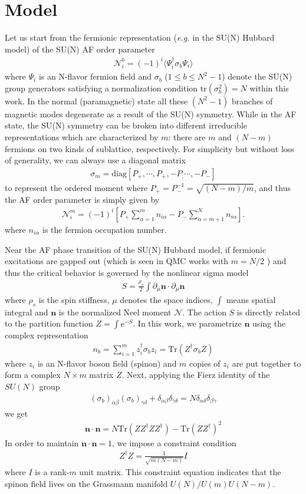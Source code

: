 \documentclass[aps,twocolumn,superscriptaddress]{revtex4-1}
\newcommand{\bea}{\begin{eqnarray}}
\newcommand{\eea}{\end{eqnarray}}
\newcommand{\bn}{\mathbf{n}}
\newcommand{\eg}{\textit{e.g.{ }}}
\newcommand{\me}{\mathrm{e}}
\begin{document}
\section{Model}
Let us start from the fermionic representation (\eg in the SU(N) Hubbard model) of the SU(N) AF order parameter \bea
\mathcal{N}_i^b=(-1)^i\langle \Psi_i^\dagger \sigma_b \Psi_i\rangle \eea where $\Psi_i$ is an N-flavor fermion field and
$\sigma_b$ ($1\le b\le N^2-1$) denote the SU(N) group generators satisfying a normalization condition
$\mathrm{tr}(\sigma_b^2)=N$ within this work. In the normal (paramagnetic) state all these $(N^2-1)$ branches of magnetic modes
degenerate as a result of the SU(N) symmetry. While in the AF state, the SU(N) symmetry can be broken into different
irreducible representations which are characterized by $m$: there are $m$ and $(N-m)$ fermions on two kinds of
sublattice, respectively. For simplicity but without loss of generality, we can always use a diagonal matrix \bea
\sigma_m=\text{diag}\left[P_+,\cdots,P_+,-P_,\cdots,-P_-\right] \eea to represent the ordered moment where
$P_+=P_-^{-1}=\sqrt{(N-m)/m}$, and thus the AF order parameter is simply given by \bea
\mathcal{N}_i^m=(-1)^i\left[P_+\sum_{\alpha=1}^m n_{i\alpha}-P_-\sum_{\alpha=m+1}^{N}n_{i\alpha} \right]. \eea where
$n_{i\alpha}$ is the fermion occupation number. 

Near the AF phase transition of the SU(N) Hubbard model, if fermionic excitations are gapped out (which is seen in QMC
works with $m=N/2$ \cite{cai2013,wang2014}) and thus the critical behavior is governed by the nonlinear sigma model \bea
\label{eq:NLsM}S=\frac{\rho_s}{2}\int \partial_\mu\bn \cdot \partial_\mu\bn \eea where $\rho_s$ is the spin stiffness,
$\mu$ denotes the space indices, $\int$ means spatial integral and $\bn$ is the normalized Neel moment $\mathcal{N}$.
The action $S$ is directly related to the partition function $Z=\int \me^{-S}$. In this work, we parametrize $\bn$ using
the complex representation \bea \label{eq:cprep}n_b=\sum_{i=1}^m z_i^\dag \sigma_b z_i=\mathrm{Tr}(Z^\dag\sigma_b Z)
\eea where $z_i$ is an N-flavor boson field (spinon) and $m$ copies of $z_i$ are put together to form a complex
$N\times m$ matrix $Z$. Next, applying the Fierz identity of the $SU(N)$ group \bea \label{eq:Fierz}
(\sigma_b)_{\alpha\beta}
(\sigma_b)_{\gamma\delta}+\delta_{\alpha\beta}\delta_{\gamma\delta}=N\delta_{\alpha\delta}\delta_{\beta\gamma} \eea we
get \bea \bn\cdot\bn = N\mathrm{Tr}(ZZ^\dag Z Z^\dag)-\mathrm{Tr}(ZZ^\dag)^2 \eea In order to maintain $\bn\cdot\bn=1$,
we impose a constraint condition \bea Z^\dag Z=\frac{1}{\sqrt{m(N-m)}}I \label{eq:normalizeZ}\eea where $I$ is a
rank-$m$ unit matrix. This constraint equation indicates that the spinon field lives on the Grassmann manifold
$U(N)/U(m)U(N-m)$. 
\end{document}
